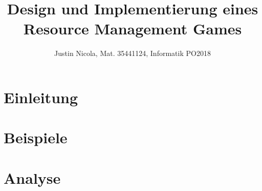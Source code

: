 \documentclass{article}
\title{Design und Implementierung eines Resource Management Games}
\author{Justin Nicola, Mat. 35441124, Informatik PO2018}
\begin{document}






\maketitle
\section{Einleitung}


\section{Beispiele}


\section{Analyse}



\newpage
\printbibliography

\newpage

\end{document}

